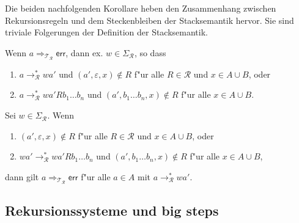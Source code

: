 \documentclass[12pt,a4paper,final]{article}
\begin{document}
Die beiden nachfolgenden Korollare heben den Zusammenhang zwischen Rekursionsregeln
und dem Steckenbleiben der Stacksemantik hervor. Sie sind triviale Folgerungen der
Definition der Stacksemantik.
\begin{corollary}
  Wenn \mbox{$a \Rightarrow_{\mathcal{T}_{\mathcal{R}}} \mathsf{err}$},
  dann ex. \mbox{$w \in \Sigma_{\mathcal{R}}$}, so dass
  \begin{enumerate}
  \item \mbox{$a \rightarrow_{\mathcal{R}}^* wa'$} und \mbox{$(a',\varepsilon,x) \not\in R$}
    f"ur alle \mbox{$R \in \mathcal{R}$} und \mbox{$x \in A \cup B$}, oder
  \item \mbox{$a \rightarrow_{\mathcal{R}}^* wa'Rb_1 \ldots b_n$} und
    \mbox{$(a',b_1 \ldots b_n,x) \not\in R$} f"ur alle \mbox{$x \in A \cup B$}.
  \end{enumerate}
\end{corollary}

\begin{corollary}
  Sei \mbox{$w \in \Sigma_{\mathcal{R}}$}. Wenn
  \begin{enumerate}
  \item \mbox{$(a',\varepsilon,x) \not\in R$} f"ur alle \mbox{$R \in \mathcal{R}$}
    und \mbox{$x \in A \cup B$}, oder
  \item \mbox{$wa' \rightarrow_{\mathcal{R}}^* wa'Rb_1 \ldots b_n$} und
    \mbox{$(a',b_1 \ldots b_n, x) \not\in R$} f"ur alle \mbox{$x \in A \cup B$},
  \end{enumerate}
  dann gilt \mbox{$a \Rightarrow_{\mathcal{T}_{\mathcal{R}}} \mathsf{err}$} f"ur alle
  \mbox{$a \in A$} mit \mbox{$a \rightarrow_{\mathcal{R}}^* wa'$}.
\end{corollary}



\subsection{Rekursionssysteme und big steps}
\label{sec:Rekursionssysteme_und_big_steps}
\end{document}
